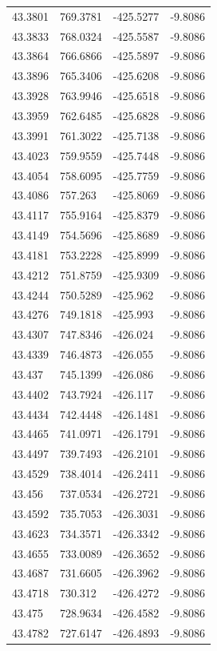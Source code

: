 \begin{table}[H]
\begin{tabular}{llll}
43.3801 & 769.3781 & -425.5277 & -9.8086 \\
43.3833 & 768.0324 & -425.5587 & -9.8086 \\
43.3864 & 766.6866 & -425.5897 & -9.8086 \\
43.3896 & 765.3406 & -425.6208 & -9.8086 \\
43.3928 & 763.9946 & -425.6518 & -9.8086 \\
43.3959 & 762.6485 & -425.6828 & -9.8086 \\
43.3991 & 761.3022 & -425.7138 & -9.8086 \\
43.4023 & 759.9559 & -425.7448 & -9.8086 \\
43.4054 & 758.6095 & -425.7759 & -9.8086 \\
43.4086 & 757.263 & -425.8069 & -9.8086 \\
43.4117 & 755.9164 & -425.8379 & -9.8086 \\
43.4149 & 754.5696 & -425.8689 & -9.8086 \\
43.4181 & 753.2228 & -425.8999 & -9.8086 \\
43.4212 & 751.8759 & -425.9309 & -9.8086 \\
43.4244 & 750.5289 & -425.962 & -9.8086 \\
43.4276 & 749.1818 & -425.993 & -9.8086 \\
43.4307 & 747.8346 & -426.024 & -9.8086 \\
43.4339 & 746.4873 & -426.055 & -9.8086 \\
43.437 & 745.1399 & -426.086 & -9.8086 \\
43.4402 & 743.7924 & -426.117 & -9.8086 \\
43.4434 & 742.4448 & -426.1481 & -9.8086 \\
43.4465 & 741.0971 & -426.1791 & -9.8086 \\
43.4497 & 739.7493 & -426.2101 & -9.8086 \\
43.4529 & 738.4014 & -426.2411 & -9.8086 \\
43.456 & 737.0534 & -426.2721 & -9.8086 \\
43.4592 & 735.7053 & -426.3031 & -9.8086 \\
43.4623 & 734.3571 & -426.3342 & -9.8086 \\
43.4655 & 733.0089 & -426.3652 & -9.8086 \\
43.4687 & 731.6605 & -426.3962 & -9.8086 \\
43.4718 & 730.312 & -426.4272 & -9.8086 \\
43.475 & 728.9634 & -426.4582 & -9.8086 \\
43.4782 & 727.6147 & -426.4893 & -9.8086 \\

\end{tabular}
\end{table}
